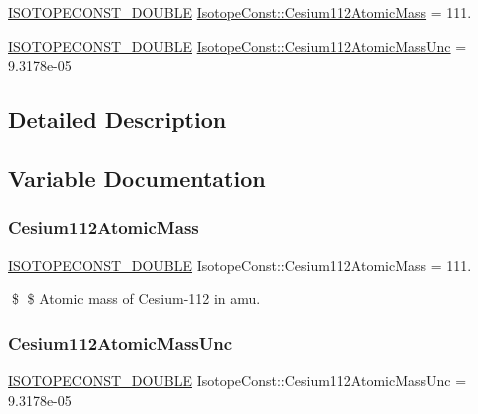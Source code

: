 \begin{DoxyCompactItemize}
\item 
\mbox{\hyperlink{group___isotope_const-_macros_ga8f45a7272ce02c0b4c65c44636ed719a}{I\+S\+O\+T\+O\+P\+E\+C\+O\+N\+S\+T\+\_\+\+D\+O\+U\+B\+LE}} \mbox{\hyperlink{group___isotope_const-_cesium-_cs112_ga35796490e9f1162f90d5145f59dd7403}{Isotope\+Const\+::\+Cesium112\+Atomic\+Mass}} = 111.
\item 
\mbox{\hyperlink{group___isotope_const-_macros_ga8f45a7272ce02c0b4c65c44636ed719a}{I\+S\+O\+T\+O\+P\+E\+C\+O\+N\+S\+T\+\_\+\+D\+O\+U\+B\+LE}} \mbox{\hyperlink{group___isotope_const-_cesium-_cs112_ga44063944b6af69d7173a15e5af833e88}{Isotope\+Const\+::\+Cesium112\+Atomic\+Mass\+Unc}} = 9.\+3178e-\/05
\end{DoxyCompactItemize}


\subsection{Detailed Description}


\subsection{Variable Documentation}
\mbox{\label{group___isotope_const-_cesium-_cs112_ga35796490e9f1162f90d5145f59dd7403}} 
\subsubsection{\texorpdfstring{Cesium112\+Atomic\+Mass}{Cesium112AtomicMass}}
{\footnotesize\ttfamily \mbox{\hyperlink{group___isotope_const-_macros_ga8f45a7272ce02c0b4c65c44636ed719a}{I\+S\+O\+T\+O\+P\+E\+C\+O\+N\+S\+T\+\_\+\+D\+O\+U\+B\+LE}} Isotope\+Const\+::\+Cesium112\+Atomic\+Mass = 111.}

\$ \$ Atomic mass of Cesium-\/112 in amu. \mbox{\label{group___isotope_const-_cesium-_cs112_ga44063944b6af69d7173a15e5af833e88}} 
\subsubsection{\texorpdfstring{Cesium112\+Atomic\+Mass\+Unc}{Cesium112AtomicMassUnc}}
{\footnotesize\ttfamily \mbox{\hyperlink{group___isotope_const-_macros_ga8f45a7272ce02c0b4c65c44636ed719a}{I\+S\+O\+T\+O\+P\+E\+C\+O\+N\+S\+T\+\_\+\+D\+O\+U\+B\+LE}} Isotope\+Const\+::\+Cesium112\+Atomic\+Mass\+Unc = 9.\+3178e-\/05}

